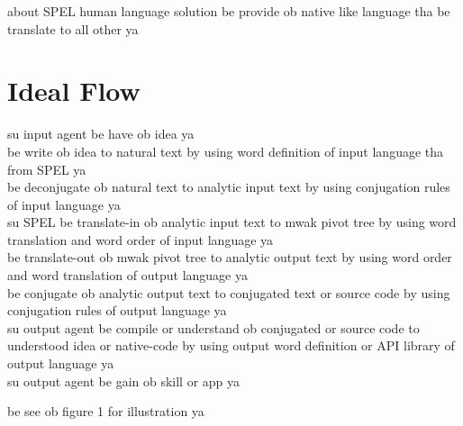 \documentclass[12pt]{article}
\begin{document}
about SPEL human language solution
be provide ob native like language
tha be translate to all other ya

\section{Ideal Flow}
su input agent be have ob idea ya\\
be write ob idea to natural text 
by using word definition of input language tha from SPEL ya\\
be deconjugate ob natural text to analytic input text 
by using conjugation rules of input language ya\\
su SPEL be translate-in ob analytic input text 
to mwak pivot tree 
by using word translation and word order of input language ya\\
be translate-out ob mwak pivot tree to analytic output text
by using  word order and word translation of output language ya\\
be conjugate ob analytic output text 
to conjugated text or source code
by using conjugation rules of output language ya\\
su output agent be compile or understand ob conjugated or source
code to understood idea or native-code by using output word
definition or API library of output language ya\\
su output agent be gain ob skill or app ya

be see ob figure 1 for illustration ya

\end{document}
